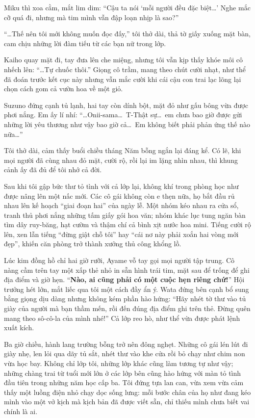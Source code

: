 \documentclass[../main.tex]{subfiles}
\begin{document}
Miku thì xoa cằm, mắt lim dim: ``Cậu ta nói `mỗi người đều đặc biệt\dots' Nghe mắc cỡ quá đi, nhưng mà tim mình vẫn đập loạn nhịp là sao?''

``\dots Thế nên tôi mới không muốn đọc đấy,'' tôi thở dài, thả tờ giấy xuống mặt bàn, cam chịu những lời đàm tiếu từ các bạn nữ trong lớp.

Kaiho quay mặt đi, tay đưa lên che miệng, nhưng tôi vẫn kịp thấy khóe môi cô nhếch lên: ``\dots Tự chuốc thôi.'' Giọng cô trầm, mang theo chút cười nhạt, như thể đã đoán trước kết cục này nhưng vẫn mắc cười khi cái cậu con trai lạc lõng lại chọn cách gom cả vườn hoa về một giỏ.

Suzuno đứng cạnh tủ lạnh, hai tay còn dính bột, mặt đỏ như gấu bông vừa được phơi nắng. Em ấy lí nhí: ``\dots Onii-sama\dots\ T-Thật sự\dots\ em chưa bao giờ được gửi những lời yêu thương như vậy bao giờ cả\dots\ Em không biết phải phản ứng thế nào nữa\dots''

Tôi thở dài, cảm thấy buổi chiều tháng Năm bỗng ngắn lại đáng kể. Có lẽ, khi mọi người đã cùng nhau đỏ mặt, cười rộ, rồi lại im lặng nhìn nhau, thì khung cảnh ấy đã đủ để tôi nhớ cả đời.

\ct

Sau khi tôi gập bức thư tỏ tình với cả lớp lại, không khí trong phòng học như được nâng lên một nấc mới. Các cô gái không còn e thẹn nữa, họ bắt đầu rủ nhau lên kế hoạch ``giai đoạn hai'' của ngày lễ. Một nhóm kéo nhau ra cửa sổ, tranh thủ phơi nắng những tấm giấy gói hoa văn; nhóm khác lục tung ngăn bàn tìm dây ruy-băng, hạt cườm và thậm chí cả bình xịt nước hoa mini. Tiếng cười rộ lên, xen lẫn tiếng ``đừng giật chỗ tôi'' hay ``cái nơ này phải xoắn hai vòng mới đẹp'', khiến căn phòng trở thành xưởng thủ công khổng lồ.

Lúc kim đồng hồ chỉ hai giờ rưỡi, Ayame vỗ tay gọi mọi người tập trung. Cô nàng cầm trên tay một xấp thẻ nhỏ in sẵn hình trái tim, mặt sau để trống để ghi địa điểm và giờ hẹn. ``\textbf{Nào, ai cũng phải có một cuộc hẹn riêng chứ!}'' Hội trưởng hét lớn, mắt liếc qua tôi một cách đầy ẩn ý. Wata đứng bên cạnh bổ sung bằng giọng dịu dàng nhưng không kém phần hào hứng: ``Hãy nhét tờ thư vào tủ giày của người mà bạn thầm mến, rồi đến đúng địa điểm ghi trên thẻ. Đừng quên mang theo sô-cô-la của mình nhé!'' Cả lớp reo hò, như thể vừa được phát lệnh xuất kích.

Ba giờ chiều, hành lang trường bỗng trở nên đông nghẹt. Những cô gái lén lút đi giày nhẹ, len lỏi qua dãy tủ sắt, nhét thư vào khe cửa rồi bỏ chạy như chim non vừa học bay. Không chỉ lớp tôi, những lớp khác cũng làm tương tự như vậy; những chàng trai từ tuổi mới lớn ở các lớp bên cũng hào hứng với màn tỏ tình đầu tiên trong những năm học cấp ba. Tôi đứng tựa lan can, vừa xem vừa cảm thấy một luồng điện nhỏ chạy dọc sống lưng: mỗi bước chân của họ như đang kéo mình vào một vở kịch mà kịch bản đã được viết sẵn, chỉ thiếu mình chưa biết vai chính là ai.
\end{document}
